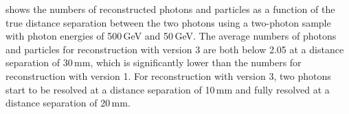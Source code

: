 
 shows the numbers of reconstructed photons and particles as a function of  the true distance separation between the two photons using a two-photon sample with photon energies of  500\,GeV and 50\,GeV.  The average numbers of photons and particles for reconstruction with \pandora version 3 are both below 2.05 at a distance separation of 30\,mm, which is significantly lower than the numbers for reconstruction with \pandora version 1. For reconstruction with \pandora version 3, two photons start to be resolved at a distance separation of 10\,mm and fully resolved at a distance separation of 20\,mm.







